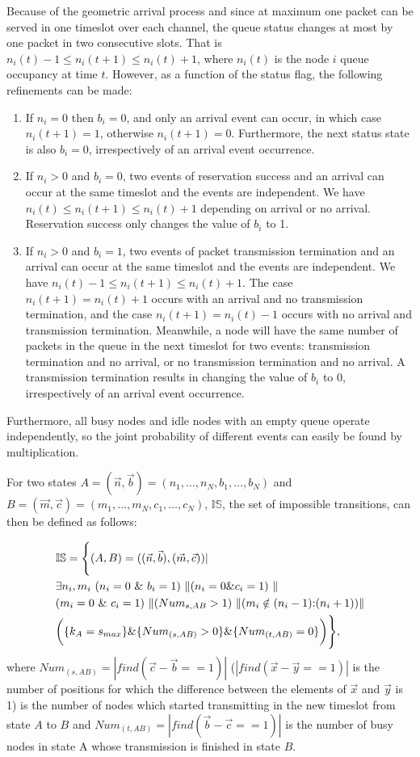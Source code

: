 \documentclass[12pt,journal,oneside,onecolumn]{IEEEtran}
\begin{document}
Because of the geometric arrival process and since at maximum one packet can be served in one timeslot 
over each channel, the queue status changes at most by one packet in two consecutive slots. 
That is $n_i(t)-1 \leq n_i(t+1) \leq n_i(t)+1$, where $n_i(t)$ is the node $i$ queue occupancy 
at time $t$. However, as a function of the status flag, the following refinements can be made:
\begin{enumerate}
	 \item If $n_i=0$ then $b_i=0$, and only an arrival event can occur, in which case $n_i(t+1)=1$, 
otherwise $n_i(t+1)=0$. Furthermore, the next status state is also $b_i=0$, irrespectively of an arrival event occurrence.
	\item If $n_i>0$ and $b_i=0$, two events of reservation success and an arrival can 
occur at the same timeslot and the events are independent. We have $n_i(t) \leq n_i(t+1) \leq n_i(t)+1$ 
depending on arrival or no arrival. Reservation success only changes the value of $b_i$ to 1.
	\item If $n_i>0$ and $b_i=1$, two events of packet transmission termination and an arrival can occur at the same timeslot and the events are independent. We have $n_i(t)-1 \leq n_i(t+1) \leq n_i(t)+1$. 
The case $n_i(t+1)=n_i(t)+1$ occurs with an arrival and no transmission termination, and the case $n_i(t+1)=n_i(t)-1$ 
occurs with no arrival and transmission termination. Meanwhile, a node will have the same number of packets in 
the queue in the next timeslot for two events: transmission termination and no arrival, or no transmission 
termination and no arrival. A transmission termination results in changing the value of $b_i$ to 0, irrespectively of 
an arrival event occurrence.
\end{enumerate}	
Furthermore, all busy nodes and idle nodes with an empty queue operate independently, 
so the joint probability of different events can easily be found by multiplication.

For two states $A=(\vec{n},\vec{b})=(n_1,\dots,n_N,b_1,\dots,b_N)$ and $B=(\vec{m},\vec{c})=(m_1,\dots,m_N,c_1,\dots,c_N)$,
$\mathbb{IS}$,  the set of impossible transitions, can then be defined as follows: 


\small
\begin{align}
&\mathbb{IS}=\Bigg{\{}(A,B)=((\vec{n},\vec{b}),(\vec{m},\vec{c}))|  \nonumber \\
&\exists n_i,m_i \mbox{ } (n_i=0 \mbox{ } \& \mbox{ } b_i=1) \mbox{ } \| (n_i=0 \& c_i=1) \mbox{ } \| \nonumber \\
&(m_i=0 \mbox{ } \& \mbox{ } c_i=1) \mbox{ } \| (Num_{s,AB}>1) \mbox{ } \| (m_i\notin  {(n_i-1){:}(n_i+1)}) \| \nonumber \\
&\bigg{(}\{k_A=s_{max}\} \& \{Num_{(s,AB)}>0\} \& \{Num_{(t,AB)}=0\}\bigg{)} \Bigg{\}}, 
\label{eq:}
\end{align}
\normalsize
where $Num_{(s,AB)}=|find(\vec{c}-\vec{b}==1)|$ ($|find(\vec{x}-\vec{y}==1)|$ 
is the number of positions for which the difference between the elements of $\vec{x}$ and $\vec{y}$ is 1)
is the number of nodes which 
started transmitting in the new timeslot from state $A$ to $B$ and $Num_{(t,AB)}=|find(\vec{b}-\vec{c}==1)|$ 
is the number of busy nodes in state A whose transmission is finished in state $B$.
\end{document}
